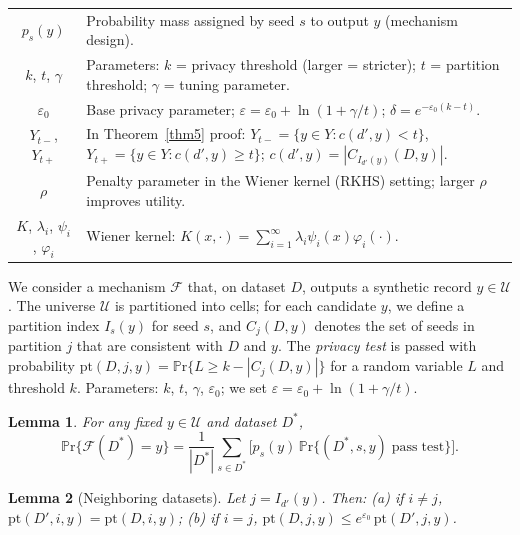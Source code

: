 \documentclass[journal,transmag]{IEEEtran}
\newtheorem{lemma}{Lemma}
\begin{document}
\begin{table}[t]
\begin{tabular}{cl}
$p_s(y)$ & Probability mass assigned by seed $s$ to output $y$ (mechanism design). \\
$k$, $t$, $\gamma$ & Parameters: $k$ = privacy threshold (larger = stricter); $t$ = partition threshold; $\gamma$ = tuning parameter. \\
$\varepsilon_0$ & Base privacy parameter; $\varepsilon = \varepsilon_0 + \ln(1+\gamma/t)$; $\delta = e^{-\varepsilon_0(k-t)}$. \\
$Y_{t-}$, $Y_{t+}$ & In Theorem~\ref{thm5} proof: $Y_{t-} = \{y \in Y : c(d',y) < t\}$, $Y_{t+} = \{y \in Y : c(d',y) \geq t\}$; $c(d',y) = |C_{I_{d'}(y)}(D,y)|$. \\
$\rho$ & Penalty parameter in the Wiener kernel (RKHS) setting; larger $\rho$ improves utility. \\
$K$, $\lambda_i$, $\psi_i$, $\varphi_i$ & Wiener kernel: $K(x,\cdot) = \sum_{i=1}^\infty \lambda_i \psi_i(x) \varphi_i(\cdot)$. \\
\hline
\end{tabular}
\end{table}

We consider a mechanism $\mathcal{F}$ that, on dataset $D$, outputs a synthetic record $y \in \mathcal{U}$. The universe $\mathcal{U}$ is partitioned into cells; for each candidate $y$, we define a partition index $I_s(y)$ for seed $s$, and $C_j(D,y)$ denotes the set of seeds in partition $j$ that are consistent with $D$ and $y$. The \emph{privacy test} is passed with probability $\mathrm{pt}(D,j,y) = \mathbb{P}\mathrm{r}\{L \geq k - |C_j(D,y)|\}$ for a random variable $L$ and threshold $k$. Parameters: $k$, $t$, $\gamma$, $\varepsilon_0$; we set $\varepsilon = \varepsilon_0 + \ln(1+\gamma/t)$.

\begin{lemma}\label{lemma:2yinU}
For any fixed $y \in \mathcal{U}$ and dataset $D^*$,
\begin{equation}
\mathbb{P}\mathrm{r}\{\mathcal{F}(D^*)=y\} = \frac{1}{|D^*|}\sum_{s \in D^*} \bigl[ p_s(y)\,\mathbb{P}\mathrm{r}\{(D^*,s,y)\;\mathrm{pass\;test}\}\bigr].
\end{equation}
\end{lemma}

\begin{lemma}[Neighboring datasets]\label{lemma:neighboringdatasets}
Let $j = I_{d'}(y)$. Then: (a) if $i \neq j$, $\mathrm{pt}(D',i,y) = \mathrm{pt}(D,i,y)$; (b) if $i = j$, $\mathrm{pt}(D,j,y) \leq e^{\varepsilon_0}\,\mathrm{pt}(D',j,y)$.
\end{lemma}
\end{document}
